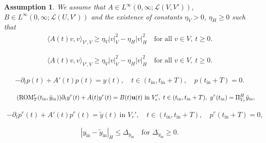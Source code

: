 \documentclass[10pt,a4paper]{amsart}
\newtheorem{assumption}{Assumption}
\newcommand{\bu}{\mathbf{u}}
\newcommand{\ddt}{\partial_t}
\newcommand{\norm}[2]{\left|#1\right|_{#2}}
\newcommand{\reduce}[1]{{{#1}^r}}
\newcommand{\scalprod}[3]{\langle#1, #2\rangle_{#3}}
\newcommand{\tildeyint}{\tilde y_{\mathrm{in}}}
\newcommand{\tint}{t_{\mathrm{in}}}
\newcommand{\yint}{y_{\mathrm{in}}}
\begin{document}
\begin{assumption}\label{ass:pde}
    We assume that $A\in L^\infty(0,\infty;\mathcal{L}(V,V'))$, $B \in  L^\infty(0,\infty;\mathcal{L}(U,V'))$
     and the existence of constants $\eta_V>0$, $\eta_H\geq 0$ such that
    \begin{align}\label{eq:weak_coercivity}
        \scalprod{A(t)v}{v}{V',V} \geq \eta_V\norm{v}{V}^2 - \eta_H\norm{v}{H}^2 \quad \text{for all } v\in V,\  t\geq 0.
    \end{align}
\end{assumption}

    \begin{align}
        \scalprod{A(t)v}{v}{V',V} \geq \eta_V\norm{v}{V}^2 - \eta_H\norm{v}{H}^2 \quad \text{for all } v\in V,\  t\geq 0.
    \end{align}

    \begin{align}
        \label{eq:FOM_opsys}
            -\ddt p(t)+A'(t)p(t)= y(t), \quad t \in  (\tint,\tint+T),\quad 
            p(\tint+T)=0.
    \end{align}

\begin{equation}
    \label{eq:reducedLTV}
    \tag{$\text{ROM}^r_{T}(\tint, \tildeyint)$}
     \ddt {\reduce {y}}(t)+A(t){{\reduce {y}}}(t)= {B}(t)\bu(t)\ \text{in } V_r', \ t \in  ( \tint,\tint+T),\ 
           \reduce{y}(\tint)
           =\Pi^H_{V_r} \tildeyint,
\end{equation}

    \begin{align}
        \label{eq:ROM_opsys}
            -\ddt {\reduce {p}}(t)+A'(t){\reduce {p}}(t)= { \tilde{y}}(t)\ \text{in } V_r', \quad t \in  ( \tint,\tint+T),\quad 
            {\reduce {p}}(\tint+T)=0,
    \end{align}

\begin{equation}\label{eq:perturb_init}
    \norm{ \yint-\tildeyint}{H} \leq \Delta_{\yint} \quad \text{for } \Delta_{\yint}\geq 0.
\end{equation}
\end{document}
